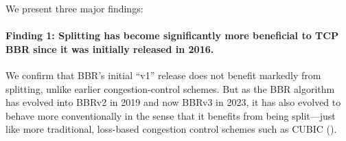 
We present three major findings:

\paragraph{Finding 1: Splitting has become significantly more beneficial to TCP
 BBR since it was initially released in 2016.}

We confirm that BBR's initial ``v1'' release does not benefit markedly from splitting, unlike earlier
congestion-control schemes. But as the BBR algorithm
has evolved into BBRv2 in 2019 and now BBRv3 in 2023, it has also evolved to
behave more conventionally in the sense that it benefits from being
split---just like more traditional, loss-based congestion control schemes such
as CUBIC ().

